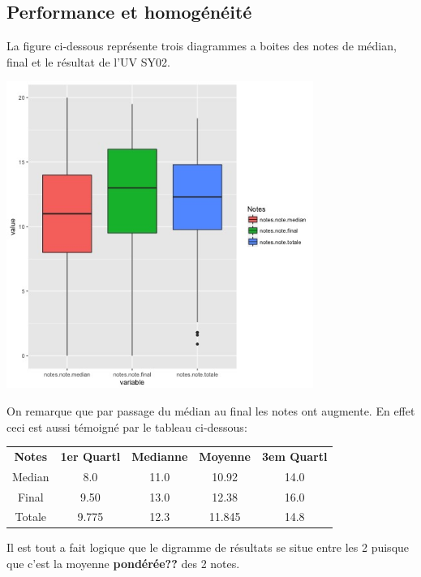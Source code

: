 \documentclass[]{report}
\begin{document}
\subsection{Performance et homogénéité}
La figure ci-dessous représente trois diagrammes a boites des notes de médian, final et le résultat de l'UV SY02.
	\begin{center}
			\includegraphics[width=100mm]{Figures/Notes/boxplot_exam.jpg}
		    \label{fig:Boxplot_notes}
	\end{center}

On remarque que par passage du médian au final les notes ont augmente. En effet ceci est aussi témoigné par le tableau ci-dessous:

\begin{center}
	\begin{tabular}{c c c c c }
		\textbf{Notes} & \textbf{1er Quartl} & \textbf{Medianne}   & \textbf{Moyenne} & \textbf{3em Quartl} \\
		Median  & 8.0 			& 11.0		 & 10.92      & 14.0\\
		Final      & 9.50 		  & 13.0 	   & 12.38	    & 16.0\\
		Totale   & 9.775        & 12.3       &  11.845    & 14.8\\
	\end{tabular}
\end{center} 

Il est tout a fait logique que le digramme de résultats se situe entre les 2 puisque que c'est la moyenne \textbf{pondérée??} des 2 notes.
 
\end{document}
